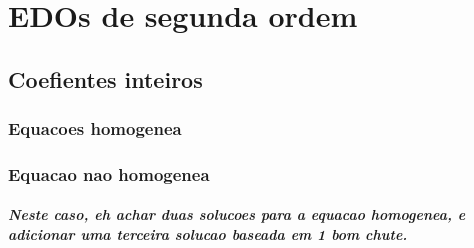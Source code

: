 \documentclass[12pt,twoside, a4paper, twocolumn]{article}
\begin{document}
\section{EDOs de segunda ordem}

\subsection{Coefientes inteiros}

\subsubsection{Equacoes homogenea}

\subsubsection{Equacao nao homogenea}

\subparagraph*{Neste caso, eh achar duas solucoes para a equacao homogenea, e adicionar uma terceira solucao baseada em 1 bom chute.}
\end{document}
